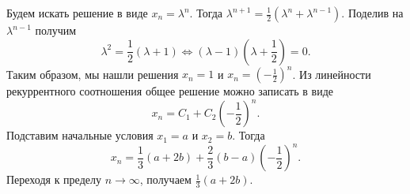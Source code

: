\documentclass{article}
\begin{document}
Будем искать решение в виде $x_n = \lambda^n$. Тогда $\lambda^{n+1} = \frac12 (\lambda^n + \lambda^{n-1})$. Поделив на $\lambda^{n-1}$ получим
$$\lambda^2 = \frac12 (\lambda + 1) \Leftrightarrow (\lambda -1)(\lambda + \frac12) = 0.$$
Таким образом, мы нашли решения $x_n=1$ и $x_n = \left( -\frac12 \right)^n$. Из линейности рекуррентного соотношения общее решение можно записать в виде $$x_n = C_1 + C_2 \left(-\frac12 \right)^n.$$
Подставим начальные условия $x_1=a$ и $x_2=b$. Тогда
$$x_n = \frac13 (a+2b) + \frac23 (b-a) \left( -\frac12 \right)^n.$$
Переходя к пределу $n \to \infty$, получаем $\frac13 (a+2b)$.
\end{document}
